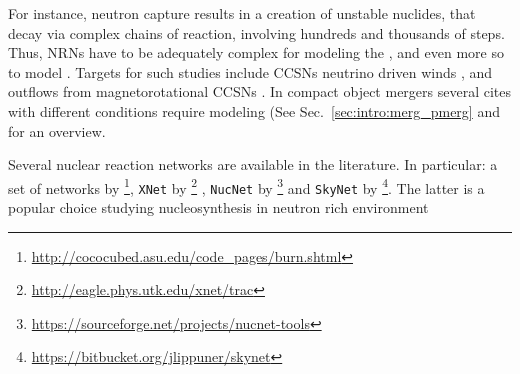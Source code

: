 %
%
For instance, neutron capture results in a creation of unstable nuclides, 
that decay via complex chains of reaction, involving hundreds and thousands of steps. 
Thus, \acp{NRN} have to be adequately complex for modeling 
the \sproc{}, \citep[\eg][]{Prantzos:1990,Kaeppeler:2011,Nishimura:2017zdi} 
and even more so to model \rproc{}. 
%
Targets for such studies include 
\acp{CCSN} neutrino driven winds \citep[\eg][]{Woosley:1992,Arcones:2010,Wanajo:2013},
and outflows from magnetorotational \acp{CCSN} \citep[\eg][]{Winteler:2012,Nishimura:2015nca}.
In compact object mergers several cites with different conditions 
require modeling (See Sec.~\ref{sec:intro:merg_pmerg} and %
%
\citet[\eg][]{Blinnikov:1996,Panov:1995,Panov:2001,Mumpower:2011ar,Lippuner:2018phd} for an overview.

Several nuclear reaction networks are available in the literature. 
In particular: a set of networks by 
\citet{Timmes:1999}\footnote{\url{http://cococubed.asu.edu/code_pages/burn.shtml}}, 
\texttt{XNet} by \citet{Hix:1999}\footnote{\url{http://eagle.phys.utk.edu/xnet/trac}} , 
\texttt{NucNet} by \citet{Meyer:2007}\footnote{\url{https://sourceforge.net/projects/nucnet-tools}}
and \texttt{SkyNet} by \citet{Lippuner:2015gwa}\footnote{\url{https://bitbucket.org/jlippuner/skynet}}.
%
The latter is a popular choice studying nucleosynthesis in neutron rich environment
\citep{Lippuner:2015gwa,Radice:2016dwd,Roberts:2016igt,Lippuner:2017tyn,Siegel:2017nub,Vlasov:2017nou,Fernandez:2016sbf}


